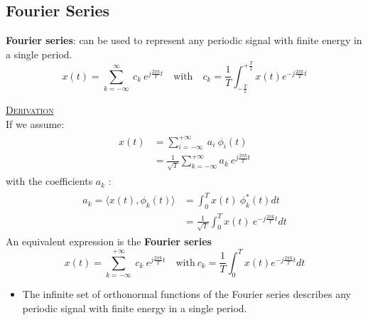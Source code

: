 \documentclass[12pt,a4paper]{article}
\begin{document}
\subsection{Fourier Series}
\textbf{Fourier series}: can be used to represent any periodic signal with finite energy in a single period. 
\[ x(t) =  \sum_{k=-\infty}^{\infty} \ c_{k} \ e^{j\frac{2\pi k}{T}t} \quad \text{with} \quad c_{k} = \frac{1}{T} \int_{-\frac{T}{2}}^{+\frac{T}{2}} x(t)e^{-j\frac{2\pi k}{T}t} \]
\begin{tcolorbox}[breakable]
\underline{\textsc{Derivation}}\\
If we assume:
\begin{align*}\begin{split}
 x(t) &= \sum_{i=-\infty}^{+\infty} \ a_{i} \ \phi_{i}(t) \\
&= \frac{1}{\sqrt{T}} \sum_{k=-\infty}^{+\infty} a_{k} \ e^{j\frac{2\pi k}{T}t}
\end{split} \end{align*}
with the coefficients $a_{k}$ :
\begin{align*}\begin{split}
a_{k} = \langle x(t), \phi_{k}(t) \rangle &=  \int_{0}^{T} x(t)\ \phi_{k}^{*}(t)dt \\
&=  \frac{1}{\sqrt{T}} \int_{0}^{T} x(t)\ e^{-j\frac{2\pi k}{T}t} dt 
\end{split} \end{align*}
An equivalent expression is the \textbf{Fourier series}
\[ x(t) =  \sum_{k=-\infty}^{+\infty} \ c_{k} \ e^{j\frac{2\pi k}{T}t} \quad \text{with} \ c_{k} = \frac{1}{T} \int_{0}^{T} x(t)e^{-j\frac{2\pi k}{T}t} dt \]
\end{tcolorbox}
\begin{itemize}
\item The infinite set of orthonormal functions of the Fourier series describes any periodic signal with finite energy in a single period.
\end{itemize}
\end{document}
